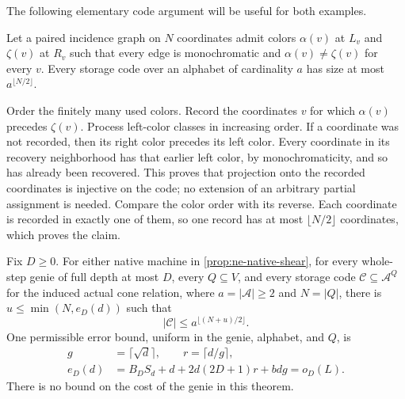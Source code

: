 The following elementary code argument will be useful for both examples.

\begin{lemma}\label{lem:ne-color-injection}
Let a paired incidence graph on $N$ coordinates admit colors
$\alpha(v)$ at $L_v$ and $\zeta(v)$ at $R_v$ such that every edge is
monochromatic and $\alpha(v)\ne\zeta(v)$ for every $v$.  Every storage
code over an alphabet of cardinality $a$ has size at most
$a^{\lfloor N/2\rfloor}$.
\end{lemma}

\begin{outline}
Order the finitely many used colors.  Record the coordinates $v$ for which
$\alpha(v)$ precedes $\zeta(v)$.  Process left-color classes in increasing
order.  If a coordinate was not recorded, then its right color precedes
its left color.  Every coordinate in its recovery neighborhood has that
earlier left color, by monochromaticity, and so has already been recovered.
This proves that projection onto the recorded coordinates is injective on
the code; no extension of an arbitrary partial assignment is needed.
Compare the color order with its reverse. Each coordinate is recorded in
exactly one of them, so one record has at most $\lfloor N/2\rfloor$
coordinates, which proves the claim.
\end{outline}

\begin{theorem}
\notformalized
\label{thm:ne-full-cone-half}
Fix $D\ge0$.  For either native machine in
\cref{prop:ne-native-shear}, for every whole-step genie of full
depth at most $D$, every $Q\subseteq V$, and every storage code
$\mathcal C\subseteq\mathcal A^Q$ for the induced actual cone relation,
where $a=|\mathcal A|\ge2$ and $N=|Q|$, there is $u\le\min(N,e_D(d))$
such that
\[
 |\mathcal C|\le a^{\lfloor(N+u)/2\rfloor}.
\]
One permissible error bound, uniform in the genie, alphabet, and $Q$, is
\[
 \begin{split}
 g&=\lceil\sqrt d\rceil,\qquad r=\lceil d/g\rceil,\\
 e_D(d)&=B_DS_d+d+2d(2D+1)r+bdg=o_D(L).
 \end{split}
\]
There is no bound on the cost of the genie in this theorem.
\end{theorem}

